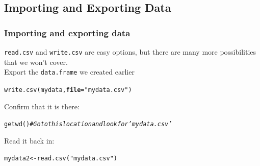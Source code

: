 \documentclass[color=usenames,dvipsnames]{beamer}\usepackage[]{graphicx}\usepackage[]{color}
\makeatletter
\newcommand{\hlstr}[1]{\textcolor[rgb]{0.749,0.012,0.012}{#1}}%
\newcommand{\hlcom}[1]{\textcolor[rgb]{0.514,0.506,0.514}{\textit{#1}}}%
\newcommand{\hlstd}[1]{\textcolor[rgb]{0,0,0}{#1}}%
\newcommand{\hlkwb}[1]{\textcolor[rgb]{0,0.341,0.682}{#1}}%
\newcommand{\hlkwc}[1]{\textcolor[rgb]{0,0,0}{\textbf{#1}}}%
\newcommand{\hlkwd}[1]{\textcolor[rgb]{0.004,0.004,0.506}{#1}}%
\newenvironment{kframe}{%
 \def\at@end@of@kframe{}%
 \ifinner\ifhmode%
  \def\at@end@of@kframe{\end{minipage}}%
  \begin{minipage}{\columnwidth}%
 \fi\fi%
 \def\FrameCommand##1{\hskip\@totalleftmargin \hskip-\fboxsep
 \colorbox{shadecolor}{##1}\hskip-\fboxsep
     \hskip-\linewidth \hskip-\@totalleftmargin \hskip\columnwidth}%
 \MakeFramed {\advance\hsize-\width
   \@totalleftmargin\z@ \linewidth\hsize
   \@setminipage}}%
 {\par\unskip\endMakeFramed%
 \at@end@of@kframe}
\newenvironment{knitrout}{}{} %
\newcommand{\inr}[1]{\colorbox{inlinecolor}{\texttt{#1}}}
\makeatother
\begin{document}
\subsection{Importing and Exporting Data}

\begin{frame}[fragile]
  \frametitle{Importing and exporting data}
  \inr{read.csv} and \inr{write.csv} are easy options, but there are
  many more possibilities that we won't cover. \\
  \small
  \pause \vfill
  Export the \verb+data.frame+ we created earlier
\begin{knitrout}\small
{}\color{fgcolor}\begin{kframe}
\begin{alltt}
\hlkwd{write.csv}\hlstd{(mydata,} \hlkwc{file}\hlstd{=}\hlstr{"mydata.csv"}\hlstd{)}
\end{alltt}
\end{kframe}
\end{knitrout}
  \pause \vfill
Confirm that it is there:
\begin{knitrout}\scriptsize
{}\color{fgcolor}\begin{kframe}
\begin{alltt}
\hlkwd{getwd}\hlstd{()} \hlcom{# Go to this location and look for 'mydata.csv'}
\end{alltt}
\end{kframe}
\end{knitrout}
  \pause \vfill
Read it back in:
\begin{knitrout}\small
{}\color{fgcolor}\begin{kframe}
\begin{alltt}
\hlstd{mydata2} \hlkwb{<-} \hlkwd{read.csv}\hlstd{(}\hlstr{"mydata.csv"}\hlstd{)}
\end{alltt}
\end{kframe}
\end{knitrout}
\end{frame}
\end{document}
